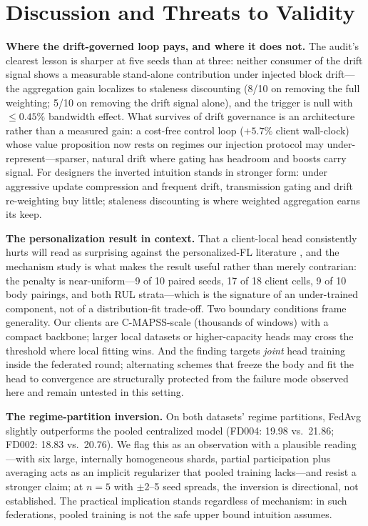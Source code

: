 \documentclass[journal]{IEEEtran}
\begin{document}
\section{Discussion and Threats to Validity}\label{sec:discussion}
\textbf{Where the drift-governed loop pays, and where it does not.} The audit's clearest lesson is sharper at five seeds than at three: neither consumer of the drift signal shows a measurable stand-alone contribution under injected block drift---the aggregation gain localizes to staleness discounting (8/10 on removing the full weighting; 5/10 on removing the drift signal alone), and the trigger is null with $\leq 0.45\%$ bandwidth effect. What survives of drift governance is an architecture rather than a measured gain: a cost-free control loop ($+5.7\%$ client wall-clock) whose value proposition now rests on regimes our injection protocol may under-represent---sparser, natural drift where gating has headroom and boosts carry signal. For designers the inverted intuition stands in stronger form: under aggressive update compression and frequent drift, transmission gating and drift re-weighting buy little; staleness discounting is where weighted aggregation earns its keep.

\textbf{The personalization result in context.} That a client-local head consistently hurts will read as surprising against the personalized-FL literature \cite{collins2021fedrep,li2021ditto,chen2023ghdr,chen2024bearing}, and the mechanism study is what makes the result useful rather than merely contrarian: the penalty is near-uniform---9 of 10 paired seeds, 17 of 18 client cells, 9 of 10 body pairings, and both RUL strata---which is the signature of an under-trained component, not of a distribution-fit trade-off. Two boundary conditions frame generality. Our clients are C-MAPSS-scale (thousands of windows) with a compact backbone; larger local datasets or higher-capacity heads may cross the threshold where local fitting wins. And the finding targets \emph{joint} head training inside the federated round; alternating schemes that freeze the body and fit the head to convergence \cite{collins2021fedrep} are structurally protected from the failure mode observed here and remain untested in this setting.

\textbf{The regime-partition inversion.} On both datasets' regime partitions, FedAvg slightly outperforms the pooled centralized model (FD004: 19.98 vs.\ 21.86; FD002: 18.83 vs.\ 20.76). We flag this as an observation with a plausible reading---with six large, internally homogeneous shards, partial participation plus averaging acts as an implicit regularizer that pooled training lacks---and resist a stronger claim; at $n = 5$ with $\pm$2--5 seed spreads, the inversion is directional, not established. The practical implication stands regardless of mechanism: in such federations, pooled training is not the safe upper bound intuition assumes.
\end{document}

